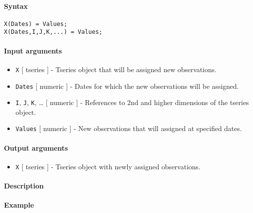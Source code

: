 


	\paragraph{Syntax}\label{syntax}

\begin{verbatim}
X(Dates) = Values;
X(Dates,I,J,K,...) = Values;
\end{verbatim}

\paragraph{Input arguments}\label{input-arguments}

\begin{itemize}
\item
  \texttt{X} {[} tseries {]} - Tseries object that will be assigned new
  observations.
\item
  \texttt{Dates} {[} numeric {]} - Dates for which the new observations
  will be assigned.
\item
  \texttt{I}, \texttt{J}, \texttt{K}, \ldots{} {[} numeric {]} -
  References to 2nd and higher dimensions of the tseries object.
\item
  \texttt{Values} {[} numeric {]} - New observations that will assigned
  at specified dates.
\end{itemize}

\paragraph{Output arguments}\label{output-arguments}

\begin{itemize}
\itemsep1pt\parskip0pt
\item
  \texttt{X} {[} tseries {]} - Tseries object with newly assigned
  observations.
\end{itemize}

\paragraph{Description}\label{description}

\paragraph{Example}\label{example}


